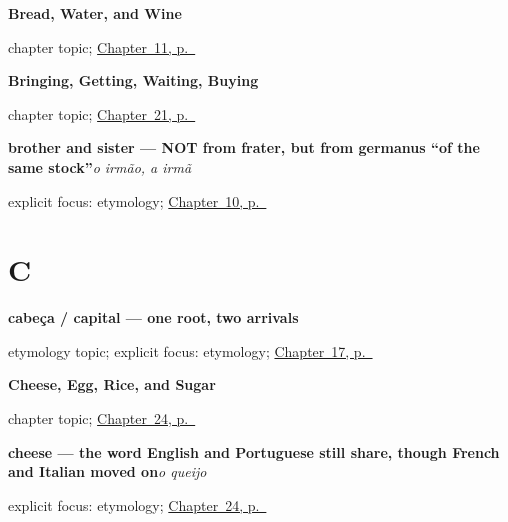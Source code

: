 \noindent\begin{minipage}[t]{\linewidth}
\raggedright
\textbf{Bread, Water, and Wine}\par
\footnotesize chapter topic; \hyperref[ch:pt-bread-water-wine]{Chapter~11, p.~\pageref*{ch:pt-bread-water-wine}}
\end{minipage}\par\smallskip

\noindent\begin{minipage}[t]{\linewidth}
\raggedright
\textbf{Bringing, Getting, Waiting, Buying}\par
\footnotesize chapter topic; \hyperref[ch:pt-bringing-getting-waiting-buying]{Chapter~21, p.~\pageref*{ch:pt-bringing-getting-waiting-buying}}
\end{minipage}\par\smallskip

\noindent\begin{minipage}[t]{\linewidth}
\raggedright
\textbf{brother and sister — NOT from frater, but from germanus \textquotedblleft{}of the same stock\textquotedblright{}}\enspace\emph{o irmão, a irmã}\par
\footnotesize explicit focus: etymology; \hyperref[ch:pt-family]{Chapter~10, p.~\pageref*{ch:pt-family}}
\end{minipage}\par\smallskip

\section*{C}

\noindent\begin{minipage}[t]{\linewidth}
\raggedright
\textbf{cabeça / capital — one root, two arrivals}\par
\footnotesize etymology topic; explicit focus: etymology; \hyperref[ch:pt-head-and-hand]{Chapter~17, p.~\pageref*{ch:pt-head-and-hand}}
\end{minipage}\par\smallskip

\noindent\begin{minipage}[t]{\linewidth}
\raggedright
\textbf{Cheese, Egg, Rice, and Sugar}\par
\footnotesize chapter topic; \hyperref[ch:pt-cheese-egg-rice-sugar]{Chapter~24, p.~\pageref*{ch:pt-cheese-egg-rice-sugar}}
\end{minipage}\par\smallskip

\noindent\begin{minipage}[t]{\linewidth}
\raggedright
\textbf{cheese — the word English and Portuguese still share, though French and Italian moved on}\enspace\emph{o queijo}\par
\footnotesize explicit focus: etymology; \hyperref[ch:pt-cheese-egg-rice-sugar]{Chapter~24, p.~\pageref*{ch:pt-cheese-egg-rice-sugar}}
\end{minipage}\par\smallskip

